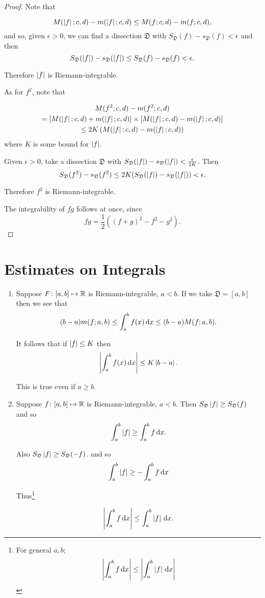 \documentclass{notes}
\theoremstyle{plain}
\newcommand{\dis}{\mathfrak{D}}
\begin{document}
\begin{proof}
Note that

\[
M(\left|f\right|;c,d)-m(\left|f\right|;c,d) \leq M(f;c,d)-m(f;c,d),
\]
and so, given $ \epsilon>0 $, we can find a dissection $ \dis $ 
with $S_{\dis}(f)-s_{\dis}(f) < \epsilon$
and then
\[
S_{\dis}(\abs{f})-s_{\dis}(\abs{f}) \leq S_{\dis}(f)-s_{\dis}(f)< 
\epsilon.
\]

Therefore $ \left|f\right| $ is Riemann-integrable.

As for $f^2$, note that

\begin{multline*}
M(f^{2};c,d)-m(f^{2};c,d) \cr
= \left[ M(\left|f\right|;c,d) + m(\left|f\right|;c,d) \right] \times
\left[ M(\left|f\right|;c,d)-m(\left|f\right|;c,d) \right] \\
\leq 2K \left( M(\left|f\right|;c,d) - m(\left|f\right|;c,d) \right)
\end{multline*}
where $ K $ is some bound for $ \left|f\right| $.

Given $ \epsilon>0 $, take a dissection $ \dis $ with
$S_{\dis}(\abs{f}) - s_{\dis}(\abs{f}) < \frac{\epsilon}{2K}$.
Then
\[ S_{\dis}(f^{2})-s_{\dis}(f^{2}) \leq 2K(S_{\dis}(\abs{f}) - 
s_{\dis}(\abs{f})) < \epsilon. \]

Therefore $ f^{2} $ is Riemann-integrable.

The integrability of $fg$ follows at once, since
\[ fg = \frac{1}{2} \left( (f+g)^{2}-f^{2}-g^{2} \right). \]
\end{proof}

\section*{Estimates on Integrals}
\begin{enumerate}
\item
Suppose $ F\colon [a,b] \mapsto \mathbb{R} $ is Riemann-integrable, $ a<b $.
If we take $\dis = [a,b]$
then we see that
\[
(b-a)m(f;a,b) \leq \int_{a}^{b}f(x)\,\mathrm{d} x \leq (b-a)M(f;a,b).
\]

It follows that if $ \left|f\right| \leq K $ then
\[
\left| \int_{a}^{b}f(x)\,\mathrm{d} x\right| \leq K \left|b-a\right|.
\]

This is true even if $a \ge b$.

\item
Suppose $ f\colon [a,b] \mapsto \mathbb{R} $ is Riemann-integrable, $ a<b $.
Then $S_{\dis}\abs{f} \geq S_{\dis}(f)$
and so
\[ \int_{a}^{b}\left|f\right| \geq \int_{a}^{b}f \,\mathrm{d} x. \]

Also $S_{\dis}\abs{f} \geq S_{\dis}(-f)$.
and so
\[ \int_{a}^{b}\left|f\right| \geq -\int_{a}^{b}f \,\mathrm{d} x \]

Thus\footnote{
For general $ a,b $;
\[ \left|\int_{a}^{b}f \,\mathrm{d} x\right| \leq \left|\int_{a}^{b}\left|f\right|\,\mathrm{d} x\right| \]}

\[ \left|\int_{a}^{b}f \,\mathrm{d} x \right| \leq \int_{a}^{b}\left|f\right| \,\mathrm{d} x. \]
\end{enumerate}
\end{document}

